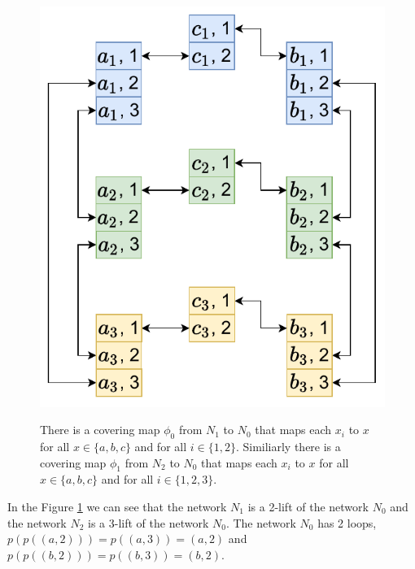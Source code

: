 \begin{figure}[H]
{    \includegraphics[scale=0.46]{diagrams/covering_map_5c.pdf}
  }
  \caption{
    There is a covering map $\phi_0$ from $N_1$ to $N_0$ that maps each $x_i$ to $x$ for all $x \in \{a, b, c\}$ and for all $i \in \{1, 2\}$.
    Similiarly there is a covering map $\phi_1$ from $N_2$ to $N_0$ that maps each $x_i$ to $x$ for all $x \in \{a, b, c\}$ and for all $i \in \{1, 2, 3\}$.
  }
  \label{fig:covering_map3}
\end{figure}

In the Figure \ref{fig:covering_map3} we can see that the network $N_1$ is a 2-lift of the network $N_0$ and the network $N_2$ is a 3-lift of the network $N_0$.
The network $N_0$ has 2 loops, $p(p((a, 2))) = p((a, 3)) = (a, 2)$ and $p(p((b, 2))) = p((b, 3)) = (b, 2)$.




